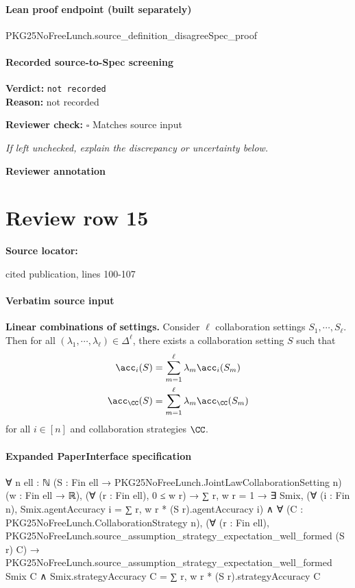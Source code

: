 \documentclass[10pt]{article}
\newcommand{\reviewerbox}{%
  \par\noindent\fbox{\parbox{0.96\linewidth}{\rule{0pt}{0.38in}}}\par
}
\newcommand{\reviewmatch}[1]{%
  \par\noindent\textbf{Reviewer check:} $\square$\; #1\par
  \noindent\emph{If left unchecked, explain the discrepancy or uncertainty below.}\par
}
\begin{document}
\paragraph{Lean proof endpoint (built separately)}\begin{ReviewVerbatim}
PKG25NoFreeLunch.source_definition_disagreeSpec_proof
\end{ReviewVerbatim}

\paragraph{Recorded source-to-Spec screening}
\textbf{Verdict:} \texttt{not recorded}
\\
\textbf{Reason:} not recorded
\reviewmatch{Matches source input}
\noindent\textbf{Reviewer annotation}\par
\reviewerbox
\clearpage
\hypertarget{source-claim-bee3bb1dc601f6f9}{}
\section*{Review row 15}
\textbf{Source locator:} {\footnotesize\raggedright cited publication, lines 100-\allowbreak{}107\par}
\paragraph{Verbatim source input}
\begin{ReviewVerbatim}
\begin{proposition}\label{prop:linear-combination} \textbf{Linear combinations of settings.}
    Consider $\ell$ collaboration settings $S_1, \cdots, S_\ell$. Then for all $(\lambda_1, \cdots, \lambda_\ell)\in \Delta^\ell$, there exists a collaboration setting $S$ such that
    \begin{align}
        \acc_i(S) &= \sum_{m=1}^\ell \lambda_m \acc_i(S_m)\label{eq:monstera-1}\\
        \acc_\CC(S) &= \sum_{m=1}^\ell \lambda_m \acc_\CC(S_m)\label{eq:monstera-2}
    \end{align}
    for all $i\in [n]$ and collaboration strategies $\CC$.
\end{proposition}
\end{ReviewVerbatim}


\paragraph{Expanded PaperInterface specification}
\begin{ReviewVerbatim}
∀ {n ell : ℕ} (S : Fin ell → PKG25NoFreeLunch.JointLawCollaborationSetting n) (w : Fin ell → ℝ),
  (∀ (r : Fin ell), 0 ≤ w r) →
    ∑ r, w r = 1 →
      ∃ Smix,
        (∀ (i : Fin n), Smix.agentAccuracy i = ∑ r, w r * (S r).agentAccuracy i) ∧
          ∀ (C : PKG25NoFreeLunch.CollaborationStrategy n),
            (∀ (r : Fin ell), PKG25NoFreeLunch.source_assumption_strategy_expectation_well_formed (S r) C) →
              PKG25NoFreeLunch.source_assumption_strategy_expectation_well_formed Smix C ∧
                Smix.strategyAccuracy C = ∑ r, w r * (S r).strategyAccuracy C
\end{ReviewVerbatim}
\end{document}
